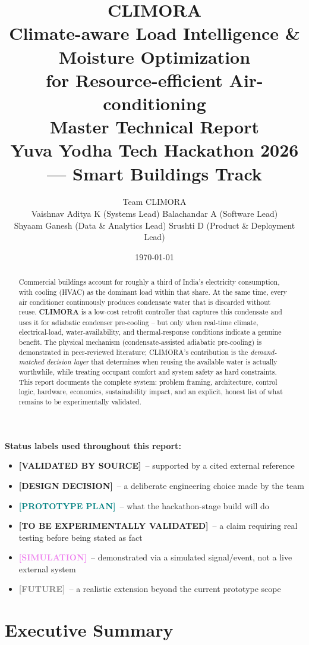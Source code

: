 \documentclass[11pt,a4paper]{article}
\title{
    \vspace{-1cm}
    {\Huge \textbf{\textcolor{climoragreen}{CLIMORA}}}\\[0.3cm]
    {\large Climate-aware Load Intelligence \& Moisture Optimization \\ for Resource-efficient Air-conditioning}\\[0.5cm]
    {\normalsize Master Technical Report}\\
    {\normalsize Yuva Yodha Tech Hackathon 2026 --- Smart Buildings Track}
}
\author{Team CLIMORA \\[0.2cm]
\small Vaishnav Aditya K (Systems Lead) \quad Balachandar A (Software Lead) \\
\small Shyaam Ganesh (Data \& Analytics Lead) \quad Srushti D (Product \& Deployment Lead)}
\date{\today}
\newcommand{\validated}{\textcolor{climoragreen}{\textbf{[VALIDATED BY SOURCE]}}}
\newcommand{\design}{\textcolor{blue!60!black}{\textbf{[DESIGN DECISION]}}}
\newcommand{\prototype}{\textcolor{teal}{\textbf{[PROTOTYPE PLAN]}}}
\newcommand{\tobevalidated}{\textcolor{red!70!black}{\textbf{[TO BE EXPERIMENTALLY VALIDATED]}}}
\newcommand{\simulation}{\textcolor{violet}{\textbf{[SIMULATION]}}}
\newcommand{\future}{\textcolor{gray}{\textbf{[FUTURE]}}}
\begin{document}
\maketitle
\thispagestyle{empty}

\begin{abstract}
\noindent
Commercial buildings account for roughly a third of India's electricity consumption, with cooling (HVAC) as the dominant load within that share. At the same time, every air conditioner continuously produces condensate water that is discarded without reuse. \textbf{CLIMORA} is a low-cost retrofit controller that captures this condensate and uses it for adiabatic condenser pre-cooling -- but only when real-time climate, electrical-load, water-availability, and thermal-response conditions indicate a genuine benefit. The physical mechanism (condensate-assisted adiabatic pre-cooling) is demonstrated in peer-reviewed literature; CLIMORA's contribution is the \emph{demand-matched decision layer} that determines when reusing the available water is actually worthwhile, while treating occupant comfort and system safety as hard constraints. This report documents the complete system: problem framing, architecture, control logic, hardware, economics, sustainability impact, and an explicit, honest list of what remains to be experimentally validated.
\end{abstract}

\vspace{0.3cm}
\noindent\textbf{Status labels used throughout this report:}
\begin{itemize}[nosep]
    \item \validated\ -- supported by a cited external reference
    \item \design\ -- a deliberate engineering choice made by the team
    \item \prototype\ -- what the hackathon-stage build will do
    \item \tobevalidated\ -- a claim requiring real testing before being stated as fact
    \item \simulation\ -- demonstrated via a simulated signal/event, not a live external system
    \item \future\ -- a realistic extension beyond the current prototype scope
\end{itemize}

\newpage
\tableofcontents
\newpage

\section{Executive Summary}
\end{document}
